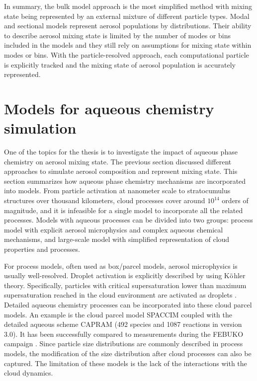\documentclass[edeposit,fullpage]{uiucthesis2009}
\begin{document}
In summary, the bulk model approach is the most simplified method with
mixing state being represented by an external mixture of different
particle types. Modal and sectional models represent aerosol
populations by distributions. Their ability to describe aerosol mixing
state is limited by the number of modes or bins included in the models
and they still rely on assumptions for mixing state within modes or
bins. With the particle-resolved approach, each computational particle
is explicitly tracked and the mixing state of aerosol population is
accurately represented.

\section{Models for aqueous chemistry simulation }
One of the topics for the thesis is to investigate the impact of
aqueous phase chemistry on aerosol mixing state. The previous section
discussed different approaches to simulate aerosol composition and
represent mixing state. This section summarizes how aqueous phase
chemistry mechanisms are incorporated into models. From particle
activation at nanometer scale to stratocumulus structures over
thousand kilometers, cloud processes cover around $10^{14}$ orders of
magnitude, and it is infeasible for a single model to incorporate all
the related processes. Models with aqueous processes can be divided
into two groups: process model with explicit aerosol microphysics and
complex aqueous chemical mechanisms, and
large-scale model with simplified representation of cloud properties
and processes.

For process models, often used as box/parcel models, aerosol
microphysics is usually well-resolved. Droplet activation is
explicitly described by using K$\rm \ddot{o}$hler
theory. Specifically, particles with critical supersaturation lower
than maximum supersaturation reached in the cloud environment are activated
as droplets \citep{rothenberg2016metamodeling,
  ching2012impacts}. Detailed aqueous chemistry processes can be
incorporated into these cloud parcel models. An example is the cloud
parcel model SPACCIM coupled with the detailed aqueous scheme CAPRAM
(492 species and 1087 reactions in version 3.0). It has been
successfully compared to measurements during the FEBUKO campaign
\citep{wolke2005spaccim}. Since particle size distributions are
commonly described in process models, the modification of the size
distribution after cloud processes can also be captured. The
limitation of these models is the lack of the interactions with the
cloud dynamics. 
\end{document}

